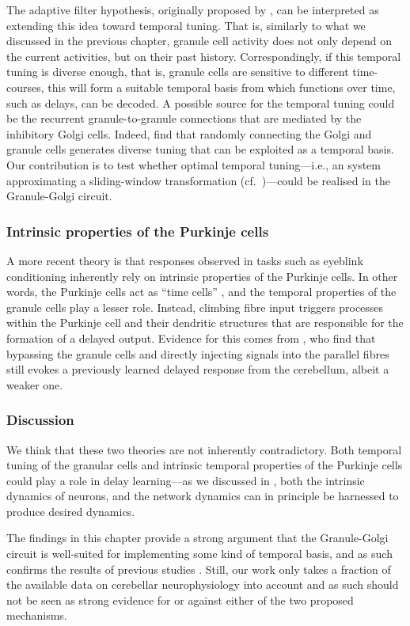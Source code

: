 The adaptive filter hypothesis, originally proposed by \citet{fujita1982adaptive}, can be interpreted as extending this idea toward temporal tuning.
That is, similarly to what we discussed in the previous chapter,
granule cell activity does not only depend on the current \PCN activities, but on their past history.
Correspondingly, if this temporal tuning is diverse enough, that is, granule cells are sensitive to different time-courses, this will form a suitable temporal basis from which functions over time, such as delays, can be decoded.
A possible source for the temporal tuning could be the recurrent granule-to-granule connections that are mediated by the inhibitory Golgi cells.
Indeed, \citet{rossert2015edge} find that randomly connecting the Golgi and granule cells generates diverse tuning that can be exploited as a temporal basis.
Our contribution is to test whether optimal temporal tuning---i.e., an \LTI system approximating a sliding-window transformation (cf.~)---could be realised in the Granule-Golgi circuit.


\subsubsection{Intrinsic properties of the Purkinje cells}
A more recent theory is that responses observed in tasks such as eyeblink conditioning inherently rely on intrinsic properties of the Purkinje cells.
In other words, the Purkinje cells act as \enquote{time cells} \citep{lusk2016cerebellar}, and the temporal properties of the granule cells play a lesser role.
Instead, climbing fibre input triggers processes within the Purkinje cell and their dendritic structures that are responsible for the formation of a delayed output.
Evidence for this comes from \citet{johansson2014memory}, who find that bypassing the granule cells and directly injecting signals into the parallel fibres still evokes a previously learned delayed response from the cerebellum, albeit a weaker one.


\subsubsection{Discussion}
We think that these two theories are not inherently contradictory.
Both temporal tuning of the granular cells and intrinsic temporal properties of the Purkinje cells could play a role in delay learning---as we discussed in , both the intrinsic dynamics of neurons, and the network dynamics can in principle be harnessed to produce desired dynamics.

The findings in this chapter provide a strong argument that the Granule-Golgi circuit is well-suited for implementing some kind of temporal basis, and as such confirms the results of previous studies \citep[cf.][]{dean2010cerebellar,rossert2015edge}.
Still, our work only takes a fraction of the available data on cerebellar neurophysiology into account and as such should not be seen as strong evidence for or against either of the two proposed mechanisms.
